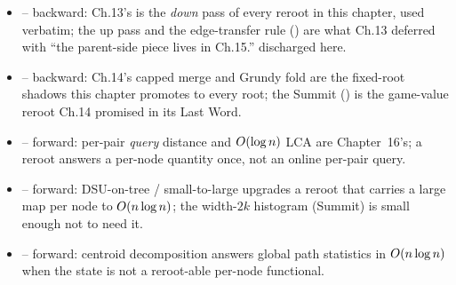 
\begin{itemize}[nosep, leftmargin=1.4em]
  \item {} -- backward: Ch.13's  is the
        \emph{down} pass of every reroot in this chapter, used verbatim; the up
        pass and the edge-transfer rule () are what
        Ch.13 deferred with ``the parent-side piece lives in Ch.15.'' discharged here.
  \item {} -- backward: Ch.14's  capped merge and
         Grundy fold are the fixed-root shadows this chapter
        promotes to every root; the Summit () is the game-value
        reroot Ch.14 promised in its Last Word.
  \item {} -- forward: per-pair \emph{query} distance and $O(\log n)$
        LCA are Chapter~16's; a reroot answers a per-node quantity once, not an
        online per-pair query.
  \item {} -- forward: DSU-on-tree / small-to-large upgrades a reroot that
        carries a large map per node to $O(n\log n)$; the width-$2k$ histogram
        (Summit) is small enough not to need it.
  \item {} -- forward: centroid decomposition answers global path statistics
        in $O(n\log n)$ when the state is not a reroot-able per-node functional.
\end{itemize}

